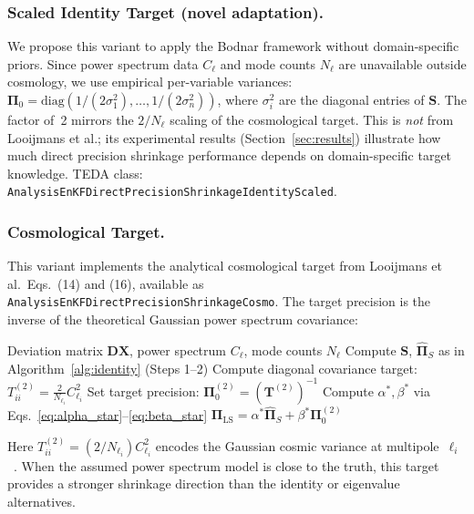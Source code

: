 \subsubsection{Scaled Identity Target (novel adaptation).}

We propose this variant to apply the Bodnar framework without domain-specific priors. Since power spectrum data $C_\ell$ and mode counts $N_\ell$ are unavailable outside cosmology, we use empirical per-variable variances: $\boldsymbol{\Pi}_0 = \text{diag}(1/(2\sigma_1^2), \ldots, 1/(2\sigma_n^2))$, where $\sigma_i^2$ are the diagonal entries of $\mathbf{S}$. The factor of~2 mirrors the $2/N_\ell$ scaling of the cosmological target. This is \emph{not} from Looijmans et al.; its experimental results (Section~\ref{sec:results}) illustrate how much direct precision shrinkage performance depends on domain-specific target knowledge. TEDA class: \texttt{Analysis\-EnKF\-Direct\-Precision\-Shrinkage\-Identity\-Scaled}.

\subsubsection{Cosmological Target.}

This variant implements the analytical cosmological target from Looijmans et al.\ Eqs.~(14) and (16), available as \texttt{Analysis\-EnKF\-Direct\-Precision\-Shrinkage\-Cosmo}. The target precision is the inverse of the theoretical Gaussian power spectrum covariance:

\begin{algorithm}[t]
\caption{Direct Precision Shrinkage (Cosmological Target)}
\label{alg:cosmo}
\begin{algorithmic}[1]
\REQUIRE Deviation matrix $\mathbf{DX}$, power spectrum $C_\ell$, mode counts $N_\ell$
\STATE Compute $\mathbf{S}$, $\hat{\boldsymbol{\Pi}}_S$ as in Algorithm~\ref{alg:identity} (Steps 1--2)
    \STATE Compute diagonal covariance target: $T^{(2)}_{ii} = \frac{2}{N_{\ell_i}} C_{\ell_i}^2$
\ENDFOR
\STATE Set target precision: $\boldsymbol{\Pi}_0^{(2)} = (\mathbf{T}^{(2)})^{-1}$
\STATE Compute $\alpha^*, \beta^*$ via Eqs.~\eqref{eq:alpha_star}--\eqref{eq:beta_star}
\RETURN $\boldsymbol{\Pi}_{\text{LS}} = \alpha^* \hat{\boldsymbol{\Pi}}_S + \beta^* \boldsymbol{\Pi}_0^{(2)}$
\end{algorithmic}
\end{algorithm}

Here $T^{(2)}_{ii} = (2/N_{\ell_i}) C_{\ell_i}^2$ encodes the Gaussian cosmic variance at multipole~$\ell_i$~\cite{hamilton2006measuring}. When the assumed power spectrum model is close to the truth, this target provides a stronger shrinkage direction than the identity or eigenvalue alternatives.

